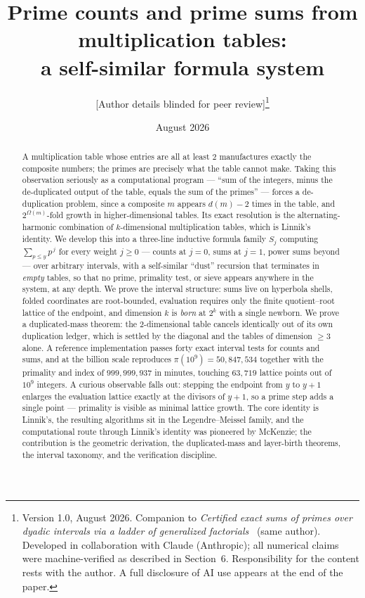 \documentclass[11pt]{article}
\title{Prime counts and prime sums from multiplication tables:\\ a self-similar formula system}
\author{[Author details blinded for peer review]\thanks{Version 1.0, August 2026. Companion to \emph{Certified exact sums of primes over dyadic
intervals via a ladder of generalized factorials}~\cite{Companion} (same author). Developed in collaboration with Claude
(Anthropic); all numerical claims were machine-verified as described in Section~6. Responsibility for
the content rests with the author. A full disclosure of AI use appears at the end of the paper.}}
\date{August 2026}
\theoremstyle{remark}
\begin{document}
\maketitle

\begin{abstract}
A multiplication table whose entries are all at least $2$ manufactures exactly the composite numbers;
the primes are precisely what the table cannot make. Taking this observation seriously as a computational
program --- ``sum of the integers, minus the de-duplicated output of the table, equals the sum of the
primes'' --- forces a de-duplication problem, since a composite $m$ appears $d(m)-2$ times in the table,
and $2^{\Omega(m)}$-fold growth in higher-dimensional tables. Its exact resolution is the
alternating-harmonic combination of $k$-dimensional multiplication tables, which is Linnik's identity.
We develop this into a three-line inductive formula family $S_j$ computing $\sum_{p \le y} p^{\,j}$ for
every weight $j \ge 0$ --- counts at $j=0$, sums at $j=1$, power sums beyond --- over arbitrary
intervals, with a self-similar ``dust'' recursion that terminates in \emph{empty} tables, so that no
prime, primality test, or sieve appears anywhere in the system, at any depth. We prove the interval
structure: sums live on hyperbola shells, folded coordinates are root-bounded, evaluation requires only
the finite quotient--root lattice of the endpoint, and dimension $k$ is \emph{born} at $2^k$ with a
single newborn. We prove a duplicated-mass theorem: the $2$-dimensional table cancels identically out
of its own duplication ledger, which is settled by the diagonal and the tables of dimension $\ge 3$
alone. A reference implementation passes forty exact interval tests for counts and sums, and at the
billion scale reproduces $\pi(10^9) = 50{,}847{,}534$ together with the primality and index of
$999{,}999{,}937$ in minutes, touching $63{,}719$ lattice points out of $10^9$ integers. A curious
observable falls out: stepping the endpoint from $y$ to $y+1$ enlarges the evaluation lattice exactly at
the divisors of $y+1$, so a prime step adds a single point --- primality is visible as minimal lattice
growth. The core identity is Linnik's, the resulting algorithms sit in the Legendre--Meissel family, and the
computational route through Linnik's identity was pioneered by McKenzie; the contribution is the
geometric derivation, the duplicated-mass and layer-birth theorems, the interval taxonomy, and the
verification discipline.
\end{abstract}
\end{document}
